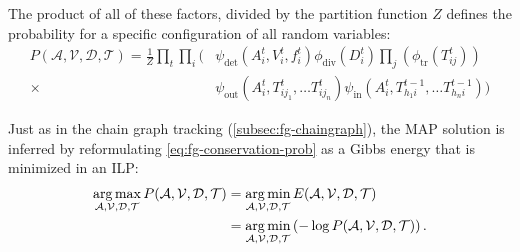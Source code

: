 The product of all of these factors, divided by the partition function $Z$ defines the probability for
a specific configuration of all random variables:
\begin{align}
    \label{eq:fg-conservation-prob}
    P(\mathcal{A}, \mathcal{V}, \mathcal{D}, \mathcal{T}) = \frac{1}{Z}\prod_t\prod_i \Biggl(
    &\psi_{\text{det}}\left(A_i^t,V_i^t,f_i^t\right ) \phi_{\text{div}}\left(D_i^t\right)
    \prod_j\left(\phi_{\text{tr}}(T_{ij}^t)\right) \\\nonumber \times &\psi_{\text{out}}\left(A_i^t,
        T_{ij_1}^t,\hdots T_{ij_n}^t\right) \psi_{\text{in}}\left(A_i^t, T_{h_1i}^{t-1},\hdots
        T_{h_ni}^{t-1}\right) \Biggr)
\end{align}

Just as in the chain graph tracking (\cref{subsec:fg-chaingraph}), the MAP solution is inferred by
reformulating \cref{eq:fg-conservation-prob} as a Gibbs energy that is minimized in an ILP:
\begin{align}
    \operatorname*{arg\,max}_{\mathcal{A}, \mathcal{V}, \mathcal{D}, \mathcal{T}}P(\mathcal{A}, \mathcal{V},
    \mathcal{D}, \mathcal{T}) & = \operatorname*{arg\,min}_{\mathcal{A}, \mathcal{V}, \mathcal{D}, \mathcal{T}} E(\mathcal{A}, \mathcal{V}, \mathcal{D}, \mathcal{T}) \\
    &= \operatorname*{arg\,min}_{\mathcal{A}, \mathcal{V}, \mathcal{D}, \mathcal{T}}\left(-\log P(\mathcal{A},
        \mathcal{V}, \mathcal{D}, \mathcal{T})\right).
    \label{eq:fg-conservation-map}
\end{align}

